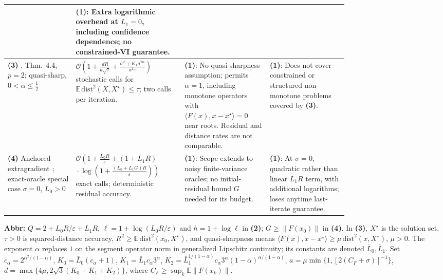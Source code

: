 \begin{table}[tp]
\begin{threeparttable}
\begin{tabularx}{\linewidth}{@{}>{\raggedright\arraybackslash}p{0.20\linewidth}>{\raggedright\arraybackslash}p{0.32\linewidth}>{\raggedright\arraybackslash}p{0.25\linewidth}>{\raggedright\arraybackslash}X@{}}
& \textbf{(1)}: Extra logarithmic overhead at $L_1=0$, including confidence dependence; no constrained-VI guarantee. \\
\midrule
\textbf{(3)} \citep{sgmVankov2025v2}, Thm.~4.4, $p=2$; quasi-sharp, $0<\alpha\le\tfrac12$
& $\mathcal{O}\!\left(1+\frac{dR}{a\sqrt\tau}+\frac{\sigma^2+K_1\sigma^{2\alpha}}{a^2\tau}\right)$ stochastic calls for $\mathbb E\,\mathrm{dist}^2(X,X^\star)\le\tau$; two calls per iteration.
& \textbf{(1)}: No quasi-sharpness assumption; permits $\alpha=1$, including monotone operators with $\langle F(x),x-x^\star\rangle=0$ near roots. Residual and distance rates are not comparable.
& \textbf{(1)}: Does not cover constrained or structured non-monotone problems covered by \textbf{(3)}. \\
\midrule
\textbf{(4)} Anchored extragradient \citep{cgmRepositoryAnchored}; exact-oracle special case $\sigma=0$, $L_0>0$
& $\mathcal{O}\!\left(1+\frac{L_0R}{\varepsilon}+(1+L_1R)\right.$\newline
$\left.{}\cdot\log\!\left(1+\frac{(L_0+L_1G)R}{\varepsilon}\right)\right)$ exact calls; deterministic residual accuracy.
& \textbf{(1)}: Scope extends to noisy finite-variance oracles; no initial-residual bound $G$ needed for its budget.
& \textbf{(1)}: At $\sigma=0$, quadratic rather than linear $L_1R$ term, with additional logarithms; loses anytime last-iterate guarantee. \\
\bottomrule
\end{tabularx}
\begin{tablenotes}[flushleft]\footnotesize
\item[] \textbf{Abbr:} $Q=2+L_0R/\varepsilon+L_1R$, $\ell=1+\log(L_0R/\varepsilon)$ and $h=1+\log\ell$ in \textbf{(2)}; $G\ge\|F(x_0)\|$ in \textbf{(4)}. In \textbf{(3)}, $X^\star$ is the solution set, $\tau>0$ is squared-distance accuracy, $R^2\ge\mathbb E\,\mathrm{dist}^2(x_0,X^\star)$, and quasi-sharpness means $\langle F(x),x-x^\star\rangle\ge\mu\,\mathrm{dist}^2(x,X^\star)$, $\mu>0$. The exponent $\alpha$ replaces $1$ on the segment operator norm in generalized Lipschitz continuity; its constants are denoted $\bar L_0,\bar L_1$. Set $c_\alpha=2^{\alpha^2/(1-\alpha)}$, $K_0=\bar L_0(c_\alpha+1)$, $K_1=\bar L_1c_\alpha3^\alpha$, $K_2=\bar L_1^{1/(1-\alpha)}c_\alpha3^\alpha(1-\alpha)^{\alpha/(1-\alpha)}$, $a=\mu\min\{1,[2(C_F+\sigma)]^{-1}\}$, $d=\max\{4\mu,2\sqrt3(K_0+K_1+K_2)\}$, where $C_F\ge\sup_k\mathbb E\|F(x_k)\|$.
\end{tablenotes}
\end{threeparttable}
\end{table}
\clearpage
